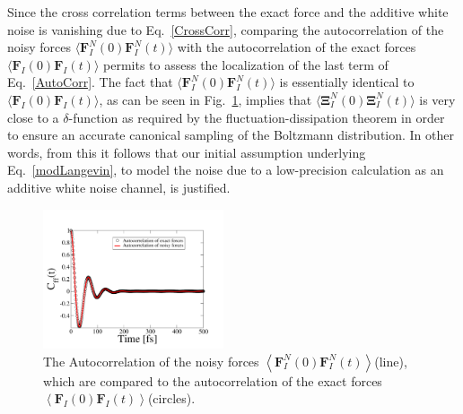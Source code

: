 \documentclass[format=acmsmall,authorversion,nonacm,timestamp,urlbreakonhyphens]{acmart}
\begin{document}
Since the cross correlation terms between the exact force and the additive white noise is vanishing due to Eq.~\ref{CrossCorr}, comparing the autocorrelation of the noisy forces $\langle \textbf{F}_{I}^{N}(0)\textbf{F}_{I}^{N}(t)\rangle$ with the autocorrelation of the exact forces $\langle \textbf{F}_{I}(0) \textbf{F}_{I}(t)\rangle$ permits to assess the localization of the last term of Eq.~\ref{AutoCorr}.
The fact that $\langle \textbf{F}_{I}^{N}(0)\textbf{F}_{I}^{N}(t)\rangle$ is essentially identical to $\langle \textbf{F}_{I}(0) \textbf{F}_{I}(t)\rangle$, as can be seen in Fig.~\ref{Fig4}, implies that $\langle \mathbf{\Xi } _{I}^{N}(0) \mathbf{\Xi } _{I}^{N}(t)\rangle$ is very close to a $\delta$-function as required by the fluctuation-dissipation theorem in order to ensure an accurate canonical sampling of the Boltzmann distribution. In other words, from this it follows that our initial assumption underlying Eq.~\ref{modLangevin}, to model the noise due to a low-precision calculation as an additive white noise channel, is justified.
\begin{figure}
\begin{center}
\includegraphics[width=0.475\textwidth]
{AutocorrelationPlot_n.pdf}
\end{center}
\caption{\label{Fig4}
The Autocorrelation of the noisy forces \(
\left \langle \textbf{F}_{I}^{N}\left ( 0 \right ) \textbf{F}_{I}^{N}\left ( t \right )\right \rangle \)(line), which are compared to the autocorrelation of the exact forces \( \left \langle \textbf{F}_{I}\left ( 0 \right ) \textbf{F}_{I}\left ( t \right )\right \rangle \)(circles).
} \end{figure}

\end{document}
